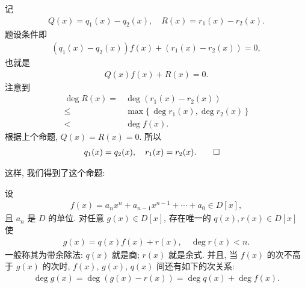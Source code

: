 \begin{pf}
    记
    \begin{align*}
        Q(x) = q_1 (x) - q_2 (x), \quad R(x) = r_1 (x) - r_2 (x).
    \end{align*}
    题设条件即
    \begin{align*}
        (q_1 (x) - q_2 (x)) f(x) + (r_1 (x) - r_2 (x)) = 0,
    \end{align*}
    也就是
    \begin{align*}
        Q(x) f(x) + R(x) = 0.
    \end{align*}
    注意到
    \begin{align*}
        \deg R(x)
        =    {} & \deg (r_1 (x) - r_2 (x))                  \\
        \leq {} & \max \{\, \deg r_1 (x), \deg r_2 (x) \,\} \\
        <    {} & \deg f(x).
    \end{align*}
    根据上个命题, $Q(x) = R(x) = 0$. 所以
    \begin{align*}
         & q_1 (x) = q_2 (x), \quad r_1 (x) = r_2 (x). \qedhere
    \end{align*}
\end{pf}

这样, 我们得到了这个命题:

\begin{proposition}
    设
    \begin{align*}
        f(x) = a_n x^n + a_{n-1} x^{n-1} + \cdots + a_0 \in D[x],
    \end{align*}
    且 $a_n$ 是 $D$ 的单位. 对任意 $g(x) \in D[x]$, 存在唯一的 $q(x), r(x) \in D[x]$ 使
    \begin{align*}
        g(x) = q(x) f(x) + r(x), \quad \deg r(x) < n.
    \end{align*}
    一般称其为带余除法: $q(x)$ 就是商; $r(x)$ 就是余式. 并且, 当 $f(x)$ 的次不高于 $g(x)$ 的次时, $f(x)$, $g(x)$, $q(x)$ 间还有如下的次关系:
    \begin{align*}
        \deg g(x) = \deg (g(x) - r(x)) = \deg q(x) + \deg f(x).
    \end{align*}
\end{proposition}
